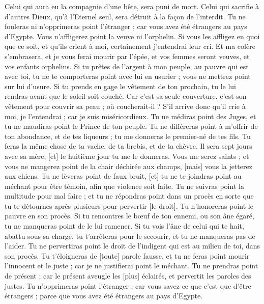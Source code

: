 \begin{multicols}{2}
Celui qui aura eu la compagnie d'une bête, sera puni de mort.
Celui qui sacrifie à d'autres Dieux, qu'à l'Eternel seul, sera détruit à la façon de l'interdit.
Tu ne fouleras ni n'opprimeras point l'étranger ; car vous avez été étrangers au pays d'Egypte.
Vous n'affligerez point la veuve ni l'orphelin.
Si vous les affligez en quoi que ce soit, et qu'ils crient à moi, certainement j'entendrai leur cri.
Et ma colère s'embrasera, et je vous ferai mourir par l'épée, et vos femmes seront veuves, et vos enfants orphelins.
Si tu prêtes de l'argent à mon peuple, au pauvre qui est avec toi, tu ne te comporteras point avec lui en usurier ; vous ne mettrez point sur lui d'usure.
Si tu prends en gage le vêtement de ton prochain, tu le lui rendras avant que le soleil soit couché.
Car c'est sa seule couverture, c'est son vêtement pour couvrir sa peau ; où coucherait-il ? S'il arrive donc qu'il crie à moi, je l'entendrai ; car je suis miséricordieux.
Tu ne médiras point des Juges, et tu ne maudiras point le Prince de ton peuple.
Tu ne différeras point à m'offrir de ton abondance, et de tes liqueurs ; tu me donneras le premier-né de tes fils.
Tu feras la même chose de ta vache, de ta brebis, et de ta chèvre. Il sera sept jours avec sa mère, [et] le huitième jour tu me le donneras.
Vous me serez saints ; et vous ne mangerez point de la chair déchirée aux champs, [mais] vous la jetterez aux chiens.
\VerseOne{}Tu ne lèveras point de faux bruit, [et] tu ne te joindras point au méchant pour être témoin, afin que violence soit faite.
Tu ne suivras point la multitude pour mal faire ; et tu ne répondras point dans un procès en sorte que tu te détournes après plusieurs pour pervertir [le droit].
Tu n'honoreras point le pauvre en son procès.
Si tu rencontres le bœuf de ton ennemi, ou son âne égaré, tu ne manqueras point de le lui ramener.
Si tu vois l'âne de celui qui te hait, abattu sous sa charge, tu t'arrêteras pour le secourir, et tu ne manqueras pas de l'aider.
Tu ne pervertiras point le droit de l'indigent qui est au milieu de toi, dans son procès.
Tu t'éloigneras de [toute] parole fausse, et tu ne feras point mourir l'innocent et le juste ; car je ne justifierai point le méchant.
Tu ne prendras point de présent ; car le présent aveugle les [plus] éclairés, et pervertit les paroles des justes.
Tu n'opprimeras point l'étranger ; car vous savez ce que c'est que d'être étrangers ; parce que vous avez été étrangers au pays d'Egypte.

\end{multicols}
